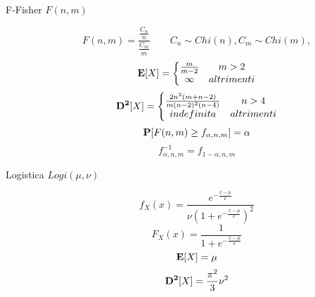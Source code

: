 \begin{description}
	\item[F-Fisher $F(n,m)$]
		\begin{equation}
		F(n,m) = \frac{\frac{C_{n}}{n}}{\frac{C_{m}}{m}}
		\qquad
		C_{n}\sim Chi(n),
		C_{m}\sim Chi(m),
		\end{equation}
		\begin{equation}
		\mathbf{E}[X] = \left\{\begin{matrix}
		\frac{m}{m-2} & m>2 \\
		\infty & altrimenti
		\end{matrix}\right.
		\end{equation}
		\begin{equation}
		\mathbf{D^{2}}[X] = \left\{\begin{matrix}
		\frac{2n^{2}(m+n-2)}{m(n-2)^{2}(n-4)} & n>4 \\
		indefinita & altrimenti
		\end{matrix}\right.
		\end{equation}
		\begin{equation}
		\mathbf{P}[F(n,m)\geq f_{\alpha,n,m}]=\alpha
		\end{equation}
		\begin{equation}
		f_{\alpha,n,m}^{-1}=f_{1-\alpha,n,m}
		\end{equation}
		
	\item[Logistica $Logi(\mu,\nu)$]
		\begin{equation}
		f_{X}(x)=\frac{e^{-\frac{x-\mu}{\nu}}}{\nu(1+e^{-\frac{x-\mu}{\nu}})^{2}}
		\end{equation}
		\begin{equation}
		F_{X}(x)=\frac{1}{1+e^{-\frac{x-\mu}{\nu}}}
		\end{equation}
		\begin{equation}
		\mathbf{E}[X]=\mu
		\end{equation}
		\begin{equation}
		\mathbf{D^{2}}[X]=\frac{\pi^{{2}}}{3}\nu^{2}
		\end{equation}
	
\end{description}
\newpage

